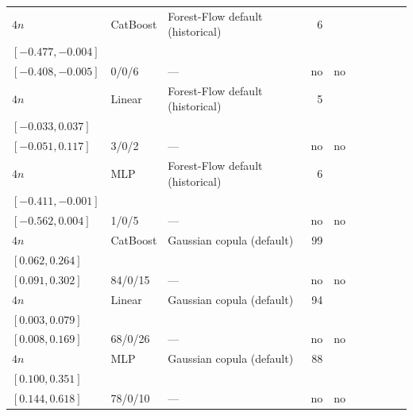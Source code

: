 \begin{longtable}{@{}ll>{\raggedright\arraybackslash}p{1.1in}rllrlll@{}}
$4n$ & CatBoost & Forest-Flow default (historical) & 6 & \begin{tabular}[t]{@{}l@{}}$-0.035$\\\tiny$[-0.477, -0.004]$\end{tabular} & \begin{tabular}[t]{@{}l@{}}$-0.231$\\\tiny$[-0.408, -0.005]$\end{tabular} & 0/0/6 & --- & no & no \\
$4n$ & Linear & Forest-Flow default (historical) & 5 & \begin{tabular}[t]{@{}l@{}}$0.000$\\\tiny$[-0.033, 0.037]$\end{tabular} & \begin{tabular}[t]{@{}l@{}}$0.002$\\\tiny$[-0.051, 0.117]$\end{tabular} & 3/0/2 & --- & no & no \\
$4n$ & MLP & Forest-Flow default (historical) & 6 & \begin{tabular}[t]{@{}l@{}}$-0.027$\\\tiny$[-0.411, -0.001]$\end{tabular} & \begin{tabular}[t]{@{}l@{}}$-0.080$\\\tiny$[-0.562, 0.004]$\end{tabular} & 1/0/5 & --- & no & no \\
$4n$ & CatBoost & Gaussian copula (default) & 99 & \begin{tabular}[t]{@{}l@{}}$0.201$\\\tiny$[0.062, 0.264]$\end{tabular} & \begin{tabular}[t]{@{}l@{}}$0.215$\\\tiny$[0.091, 0.302]$\end{tabular} & 84/0/15 & --- & no & no \\
$4n$ & Linear & Gaussian copula (default) & 94 & \begin{tabular}[t]{@{}l@{}}$0.034$\\\tiny$[0.003, 0.079]$\end{tabular} & \begin{tabular}[t]{@{}l@{}}$0.061$\\\tiny$[0.008, 0.169]$\end{tabular} & 68/0/26 & --- & no & no \\
$4n$ & MLP & Gaussian copula (default) & 88 & \begin{tabular}[t]{@{}l@{}}$0.185$\\\tiny$[0.100, 0.351]$\end{tabular} & \begin{tabular}[t]{@{}l@{}}$0.299$\\\tiny$[0.144, 0.618]$\end{tabular} & 78/0/10 & --- & no & no \\

\end{longtable}
